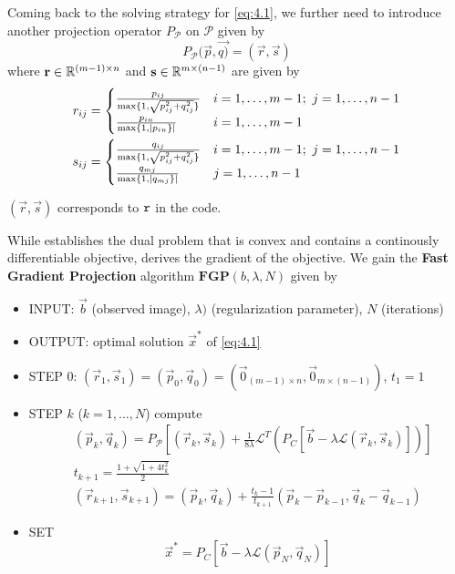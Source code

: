 Coming back to the solving strategy for \ref{eq:4.1}, we further need to introduce another projection operator $P_{\mathcal{P}}$ on $\mathcal{P}$ given by
\begin{equation}
    P_\mathcal{P}(\vec{p},\vec{q)}=(\vec{r},\vec{s})
\end{equation}
where $\vb*{\vb{r}} \in \mathbb{R}^{(m-1) \times n}$ and $\vb*{\vb{s}} \in \mathbb{R}^{m \times (n-1)}$ are given by
\begin{align}
    r_{ij} = \begin{cases}
                \frac{p_{ij}}{\max\{1,\sqrt{p_{ij}^2+q_{ij}^2}\}} &i=1,\ldots,m-1; \ j=1,\ldots,n-1\\
                \frac{p_{in}}{\max\{1,\abs{p_{in}\}}} &i=1,\ldots,m-1
            \end{cases}\\
    s_{ij} = \begin{cases}
                \frac{q_{ij}}{\max\{1,\sqrt{p_{ij}^2+q_{ij}^2}\}} &i=1,\ldots,m-1; \ j=1,\ldots,n-1\\
                \frac{q_{mj}}{\max\{1,\abs{q_{mj}\}}} &j=1,\ldots,n-1
            \end{cases}
\end{align}

$(\vec{r},\vec{s})$ corresponds to $\texttt{r}$ in the code.

While \cite[Proposition 4.1]{MR2722312} establishes the dual problem that is convex and contains a continously differentiable objective, \cite[Lemma 4.1]{MR2722312} derives the gradient of the objective. We gain the \textbf{Fast Gradient Projection} algorithm $\textbf{FGP}(b,\lambda,N)$ given by

\begin{itemize}
    \item INPUT: $\vec{b}$ (observed image), $\lambda)$ (regularization parameter), $N$ (iterations)
    \item OUTPUT: optimal solution $\vec{x}^*$ of \ref{eq:4.1}
    \item STEP $0$: $(\vec{r}_1,\vec{s}_1) = (\vec{p}_0,\vec{q}_0) = (\vec{0}_{(m-1) \times n}, \vec{0}_{m \times (n-1)})$, $t_1 = 1$
    \item STEP $k$ ($k=1,\ldots,N$) compute
    \begin{align}
        &(\vec{p}_k, \vec{q}_k) = P_{\mathcal{P}} \left[(\vec{r}_k,\vec{s}_k) + \frac{1}{8 \lambda} \mathcal{L}^T(P_C[\vec{b}-\lambda \mathcal{L}(\vec{r}_k,\vec{s}_k)])\right]\\
        &t_{k+1} = \frac{1+\sqrt{1+4 t_k^2}}{2}\\
        &(\vec{r}_{k+1},\vec{s}_{k+1}) = (\vec{p}_k,\vec{q}_k) + \frac{t_k-1}{t_{k+1}}(\vec{p}_k-\vec{p}_{k-1},\vec{q}_k-\vec{q}_{k-1})
    \end{align}
    \item SET
    \begin{equation}
        \vec{x}^* = P_C\left[\vec{b}-\lambda \mathcal{L}(\vec{p}_N,\vec{q}_N)\right]
    \end{equation}
\end{itemize}

